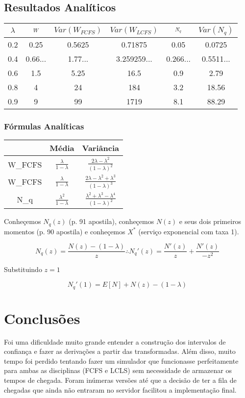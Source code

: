 \documentclass{article}
\newcommand*\barra[2][]{\overline{ #1_{#2} }}
\begin{document}
\subsection{Resultados Analíticos}
\begin{center}
\begin{tabular}{||c c c c c c||} 
 \hline
  $\lambda$ & $\barra{W}$ & $Var(W_{FCFS})$ & $Var(W_{LCFS})$ & $\barra{N_q}$ & $Var(N_{q})$ \\ [0.5ex] 
 \hline
0.2 & 0.25 & 0.5625 & 0.71875 & 0.05 & 0.0725 \\
0.4 & 0.66... & 1.77... & 3.259259... & 0.266... & 0.5511... \\
0.6 & 1.5 & 5.25 & 16.5 & 0.9 & 2.79 \\
0.8 & 4 & 24 & 184 & 3.2 & 18.56 \\
0.9 & 9 & 99 & 1719 & 8.1 & 88.29 \\
 \hline
\end{tabular}
\end{center}

\subsubsection{Fórmulas Analíticas}
\begin{center}
\begin{tabular}{||c c c||} 
 \hline
  & Média & Variância  \\ [0.5ex] 
 \hline
 W_{FCFS} & $\frac{\lambda}{1-\lambda}$ & $\frac{2\lambda-\lambda^2}{(1-\lambda)^2}$  \\ [2ex] 
 W_{FCFS} & $\frac{\lambda}{1-\lambda}$ & $\frac{2\lambda-\lambda^2+\lambda^3}{(1-\lambda)^3}$  \\ [2ex] 
 N_q & $\frac{\lambda^2}{1-\lambda}$ & $\frac{\lambda^2+\lambda^3-\lambda^4}{(1-\lambda)^2}$  \\ [2ex] 
 \hline
\end{tabular}
\end{center}

Conheçemos $N_q(z)$ (p. 91 apostila), conheçemos $N(z)$ e seus dois primeiros momentos (p. 90 apostila) e conheçemos $X^*$ (serviço exponencial com taxa 1). 

\[ N_q(z) = \frac{ N(z) - ( 1 - \lambda ) }{ z } \therefore N_q' (z) = \frac{N'(z)}{z} + \frac{N'(z)}{-z^2}\]

Substituindo $z=1$

\[ N_q' (1) = E[N] + N(z) - (1-\lambda)\]


\section{Conclusões}
Foi uma dificuldade muito grande entender a construção dos intervalos de confiança e fazer as derivações a partir das transformadas. Além disso, muito tempo foi perdido tentando fazer um simulador que funcionasse perfeitamente para ambas as disciplinas (FCFS e LCLS) sem necessidade de armazenar os tempos de chegada. Foram inúmeras versões até que a decisão de ter a fila de chegadas que ainda não entraram no servidor facilitou a implementação final. \\
\end{document}
